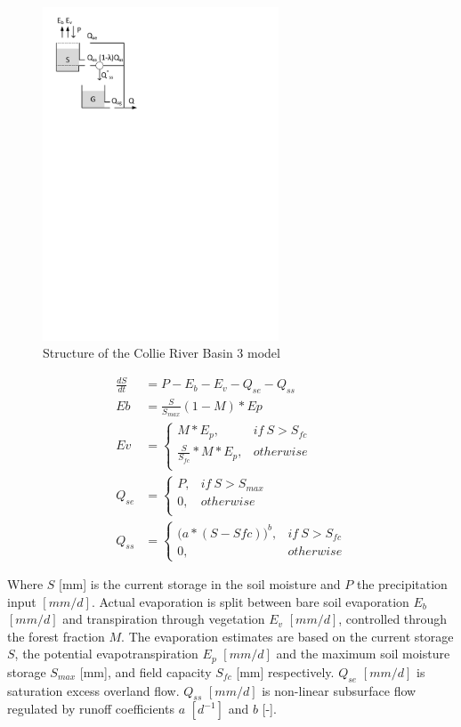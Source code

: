 { 																	%
\begin{figure}
\includegraphics[trim=1cm 20cm 9cm 1cm,width=7cm,keepaspectratio]{./AppA_files/11_schematic.pdf}
\caption{Structure of the Collie River Basin 3 model} \label{fig:11_schematic}
\end{figure}

\begin{align}
	\frac{dS}{dt} &= P -E_b - E_v -Q_{se}-Q_{ss} \\
	Eb &= \frac{S}{S_{max}}(1-M)*Ep\\
	Ev &= 
		\begin{cases}
			M*E_p, & if~S>S_{fc}\\
			\frac{S}{S_{fc}}*M*E_p, &otherwise\\
		\end{cases}\\
	Q_{se} &= 
		\begin{cases}
			P, & if~S>S_{max}\\
			0, & otherwise \\
		\end{cases}\\
	Q_{ss} &= 
		\begin{cases}
			\big(a*(S-S{fc})\big)^b, & if~S>S_{fc}\\
			0, & otherwise 
		\end{cases}
\end{align}
}
\vspace{1.5cm}

Where  $S$ [mm] is the current storage in the soil moisture and $P$ the precipitation input $[mm/d]$. Actual evaporation is split between bare soil evaporation $E_b$ $[mm/d]$ and transpiration through vegetation $E_v$ $[mm/d]$, controlled through the forest fraction $M$. The evaporation estimates are based on the current storage $S$, the potential evapotranspiration $E_p$ $[mm/d]$ and the maximum soil moisture storage $S_{max}$ [mm], and field capacity $S_{fc}$ [mm] respectively. $Q_{se}$ $[mm/d]$ is saturation excess overland flow.  $Q_{ss}$ $[mm/d]$ is non-linear subsurface flow regulated by runoff coefficients $a$ $[d^{-1}]$ and $b$ [-].

